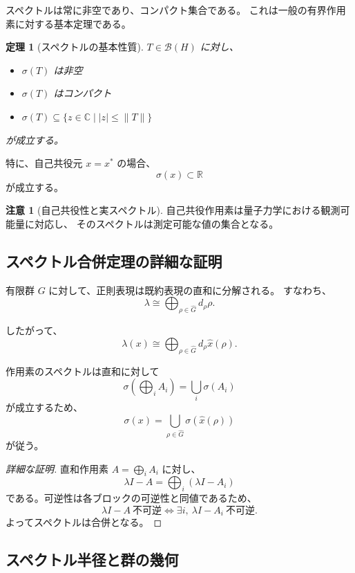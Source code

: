 \documentclass[12pt,a4paper]{ltjarticle}
\newtheorem*{theorem}{定理}
\theoremstyle{definition}
\newtheorem*{remark}{注意}
\begin{document}
スペクトルは常に非空であり、コンパクト集合である。
これは一般の有界作用素に対する基本定理である。

\begin{theorem}[スペクトルの基本性質]
$T\in\mathcal{B}(H)$ に対し、
\begin{itemize}
\item $\sigma(T)$ は非空
\item $\sigma(T)$ はコンパクト
\item $\sigma(T)\subseteq \{z\in\mathbb{C}\mid |z|\le \|T\|\}$
\end{itemize}
が成立する。
\end{theorem}

特に、自己共役元 $x = x^*$ の場合、
\[
\sigma(x) \subset \mathbb{R}
\]
が成立する。

\begin{remark}[自己共役性と実スペクトル]
自己共役作用素は量子力学における観測可能量に対応し、
そのスペクトルは測定可能な値の集合となる。
\end{remark}

\subsection{スペクトル合併定理の詳細な証明}

有限群 $G$ に対して、正則表現は既約表現の直和に分解される。
すなわち、
\[
\lambda \cong \bigoplus_{\rho \in \widehat{G}} d_\rho \rho.
\]

したがって、
\[
\lambda(x) \cong \bigoplus_{\rho \in \widehat{G}} d_\rho \widehat{x}(\rho).
\]

作用素のスペクトルは直和に対して
\[
\sigma\left(\bigoplus_i A_i\right) = \bigcup_i \sigma(A_i)
\]
が成立するため、
\[
\sigma(x) = \bigcup_{\rho \in \widehat{G}} \sigma(\widehat{x}(\rho))
\]
が従う。

\begin{proof}[詳細な証明]
直和作用素 $A=\bigoplus_i A_i$ に対し、
\[
\lambda I-A = \bigoplus_i (\lambda I-A_i)
\]
である。可逆性は各ブロックの可逆性と同値であるため、
\[
\lambda I-A\ \text{不可逆} \iff \exists i,\ \lambda I-A_i\ \text{不可逆}.
\]
よってスペクトルは合併となる。
\end{proof}

\subsection{スペクトル半径と群の幾何}
\end{document}
